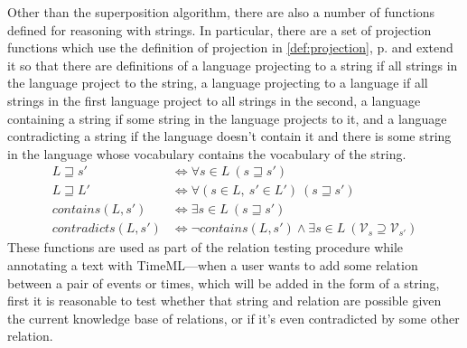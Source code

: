 \documentclass[a4paper,12pt,leqno]{article}
\newcommand{\sensp}{~\hat{\&}~}
\newcommand{\spvc}{~\&_{v\!c}~}
\newcommand{\V}{\mathcal{V}}
\begin{document}
Other than the superposition algorithm, there are also a number of functions defined for reasoning with strings. In particular, there are a set of projection functions which use the definition of projection in \cref{def:projection}, p. \pageref{def:projection} and extend it so that there are definitions of a language projecting to a string if all strings in the language project to the string, a language projecting to a language if all strings in the first language project to all strings in the second, a language containing a string if some string in the language projects to it, and a language contradicting a string if the language doesn't contain it and there is some string in the language whose vocabulary contains the vocabulary of the string.
\begin{align}
	L \sqsupseteq s' &\Longleftrightarrow \forall s \in L ~(s \sqsupseteq s')\\
	L \sqsupseteq L' &\Longleftrightarrow \forall (s \in L,~ s' \in L')~(s \sqsupseteq s')\\
	contains(L, s') &\Longleftrightarrow \exists s \in L ~(s \sqsupseteq s')\\
	contradicts(L, s') &\Longleftrightarrow \lnot contains(L, s') \land \exists s \in L ~(\V_s \supseteq \V_{s'})
\end{align}
These functions are used as part of the relation testing procedure while annotating a text with TimeML---when a user wants to add some relation between a pair of events or times, which will be added in the form of a string, first it is reasonable to test whether that string and relation are possible given the current knowledge base of relations, or if it's even contradicted by some other relation.
\end{document}
